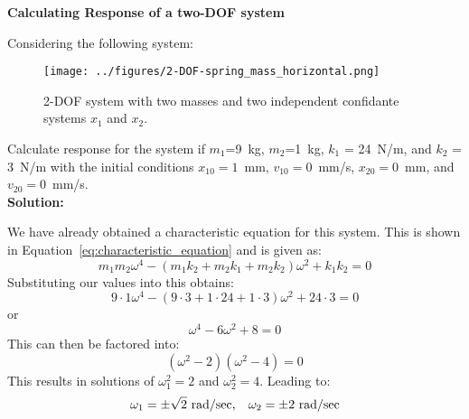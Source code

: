 \documentclass[12pt,letter]{article}
\begin{document}
	\begin{example}
	\label{ex:2-DOF}
	\textbf{Calculating Response of a two-DOF system}

	\noindent Considering the following system:
	\begin{figure}[H]
		\centering
		\texttt{[image: ../figures/2-DOF-spring\_mass\_horizontal.png]}
		\caption{2-DOF system with two masses and two independent confidante systems $x_1$ and $x_2$.}
	\end{figure}
	Calculate response for the system if $m_1$=9~kg, $m_2$=1~kg, $k_1$ = 24~N/m, and $k_2$ = 3~N/m with the initial conditions $x_{10}=1$~mm, $v_{10}=0$~mm/s, $x_{20}=0$~mm, and $v_{20}=0$~mm/s. \\
	
	
	\noindent \textbf{Solution:} 

	\noindent  We have already obtained a characteristic equation for this system. This is shown in Equation~\ref{eq:characteristic_equation} and is given as:
	\begin{equation}
	m_1 m_2 \omega^4 - (m_1 k_2 + m_2 k_1 + m_2 k_2)\omega^2 + k_1 k_2 = 0
	\end{equation}
	Substituting our values into this obtains:
	\begin{equation}
	9 \cdot 1 \omega^4 - (9 \cdot 3 + 1 \cdot 24 + 1 \cdot 3)\omega^2 + 24 \cdot 3 = 0
	\end{equation}
	or
	\begin{equation}
	\omega^4 - 6\omega^2 + 8 =0
	\end{equation}
	This can then be factored into:
	\begin{equation}
	(\omega^2-2)(\omega^2-4)=0
	\end{equation}
	This results in solutions of $\omega^2_1 = 2$ and $\omega^2_2 = 4$. Leading to:
	\begin{equation}
	\omega_1 = \pm \sqrt{2} \text{ rad/sec}, \hspace{2ex} \omega_2 = \pm 2 \text{ rad/sec}
	\end{equation}
	

\end{example}
\end{document}
